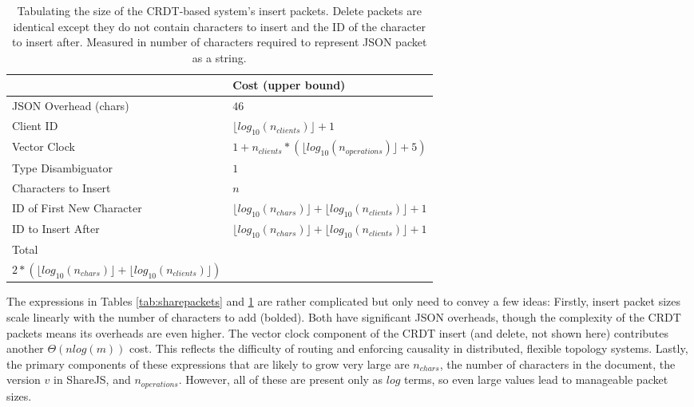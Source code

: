 \documentclass[12pt,a4paper,twoside,openright]{report}
\begin{document}
			\begin{table}[H]
			\centering
			\caption[CRDT System Insert Packet Size]{Tabulating the size of the CRDT-based system's insert packets. Delete packets are identical except they do not contain characters to insert and the ID of the character to insert after. Measured in number of characters required to represent JSON packet as a string.}
			\label{tab:crdtinsertpacket}
			\setlength{\tabcolsep}{10pt}
			\begin{tabular}{@{}ll@{}}
			
                             & Cost (upper bound)\\ \toprule                                                                                                                                                       
			JSON Overhead (chars)      & $46$ \\ \midrule
			Client ID                       & $\lfloor log_{10}(n_{clients}) \rfloor+1$  \\ \midrule
			Vector Clock                    & $1 + n_{clients} * (\lfloor log_{10}(n_{operations}) \rfloor + 5)$ \\ \midrule
			Type Disambiguator              & $1$ \\ \midrule
			Characters to Insert            & $n$ \\ \midrule
			ID of First New Character       & $\lfloor log_{10}(n_{chars}) \rfloor + \lfloor log_{10}(n_{clients}) \rfloor  +1$  \\ \midrule
			ID to Insert After & $\lfloor log_{10}(n_{chars}) \rfloor + \lfloor log_{10}(n_{clients}) \rfloor +  1$  \\ \bottomrule
			Total                           & \makecell{$51 + \boldsymbol{n} + \boldsymbol{5n_{clients}} + \boldsymbol{n_{clients} *(\lfloor log_{10}(n_{_{operations}}\rfloor)} +$ \\ $2*(\lfloor log_{10}(n_{chars}) \rfloor + \lfloor log_{10}(n_{clients}) \rfloor)$}
			\end{tabular}
			\end{table}
			
			
			
			The expressions in Tables \ref{tab:sharepackets} and \ref{tab:crdtinsertpacket} are rather complicated but only need to convey a few ideas: Firstly, insert packet sizes scale linearly with the number of characters to add (bolded). Both have significant JSON overheads, though the complexity of the CRDT packets means its overheads are even higher. The vector clock component of the CRDT insert (and delete, not shown here) contributes another $\Theta(nlog(m))$ cost. This reflects the difficulty of routing and enforcing causality in distributed, flexible topology systems. Lastly, the primary components of these expressions that are likely to grow very large are $n_{chars}$, the number of characters in the document, the version $v$ in ShareJS, and $n_{operations}$. However, all of these are present only as $log$ terms, so even large values lead to manageable packet sizes.
			
\end{document}
